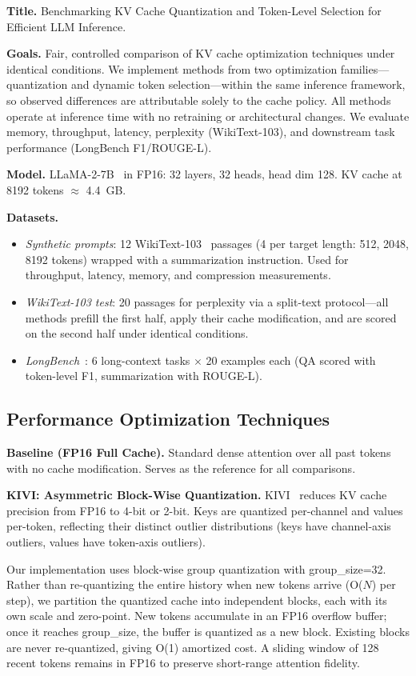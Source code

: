 \documentclass[conference]{IEEEtran}
\begin{document}
\textbf{Title.} Benchmarking KV Cache Quantization and Token-Level Selection for Efficient LLM Inference.

\textbf{Goals.} Fair, controlled comparison of KV cache optimization techniques under identical conditions. We implement methods from two optimization families---quantization and dynamic token selection---within the same inference framework, so observed differences are attributable solely to the cache policy. All methods operate at inference time with no retraining or architectural changes. We evaluate memory, throughput, latency, perplexity (WikiText-103), and downstream task performance (LongBench F1/ROUGE-L).

\textbf{Model.} LLaMA-2-7B~\cite{llama2} in FP16: 32 layers, 32 heads, head dim 128. KV cache at 8192 tokens $\approx$ 4.4~GB.

\textbf{Datasets.}
\begin{itemize}
    \item \textit{Synthetic prompts}: 12 WikiText-103~\cite{wikitext} passages (4 per target length: 512, 2048, 8192 tokens) wrapped with a summarization instruction. Used for throughput, latency, memory, and compression measurements.
    \item \textit{WikiText-103 test}: 20 passages for perplexity via a split-text protocol---all methods prefill the first half, apply their cache modification, and are scored on the second half under identical conditions.
    \item \textit{LongBench}~\cite{longbench}: 6 long-context tasks $\times$ 20 examples each (QA scored with token-level F1, summarization with ROUGE-L).
\end{itemize}

\subsection{Performance Optimization Techniques}

\textbf{Baseline (FP16 Full Cache).} Standard dense attention over all past tokens with no cache modification. Serves as the reference for all comparisons.

\textbf{KIVI: Asymmetric Block-Wise Quantization.} KIVI~\cite{kivi} reduces KV cache precision from FP16 to 4-bit or 2-bit. Keys are quantized per-channel and values per-token, reflecting their distinct outlier distributions (keys have channel-axis outliers, values have token-axis outliers).

Our implementation uses block-wise group quantization with group\_size=32. Rather than re-quantizing the entire history when new tokens arrive (O($N$) per step), we partition the quantized cache into independent blocks, each with its own scale and zero-point. New tokens accumulate in an FP16 overflow buffer; once it reaches group\_size, the buffer is quantized as a new block. Existing blocks are never re-quantized, giving O(1) amortized cost. A sliding window of 128 recent tokens remains in FP16 to preserve short-range attention fidelity.
\end{document}
